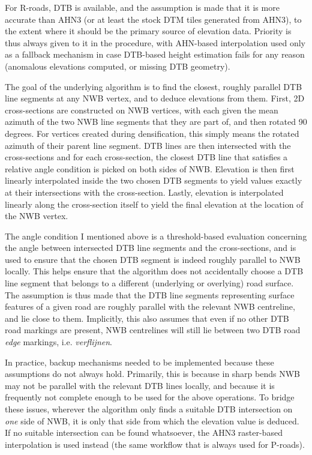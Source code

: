For R-roads, DTB is available, and the assumption is made that it is more accurate than AHN3 (or at least the stock DTM tiles generated from AHN3), to the extent where it should be the primary source of elevation data. Priority is thus always given to it in the procedure, with AHN-based interpolation used only as a fallback mechanism in case DTB-based height estimation fails for any reason (anomalous elevations computed, or missing DTB geometry).

The goal of the underlying algorithm is to find the closest, roughly parallel DTB line segments at any NWB vertex, and to deduce elevations from them. First, 2D cross-sections are constructed on NWB vertices, with each given the mean azimuth of the two NWB line segments that they are part of, and then rotated 90 degrees. For vertices created during densification, this simply means the rotated azimuth of their parent line segment. DTB lines are then intersected with the cross-sections and for each cross-section, the closest DTB line that satisfies a relative angle condition is picked on both sides of NWB. Elevation is then first linearly interpolated inside the two chosen DTB segments to yield values exactly at their intersections with the cross-section. Lastly, elevation is interpolated linearly along the cross-section itself to yield the final elevation at the location of the NWB vertex.

The angle condition I mentioned above is a threshold-based evaluation concerning the angle between intersected DTB line segments and the cross-sections, and is used to ensure that the chosen DTB segment is indeed roughly parallel to NWB locally. This helps ensure that the algorithm does not accidentally choose a DTB line segment that belongs to a different (underlying or overlying) road surface. The assumption is thus made that the DTB line segments representing surface features of a given road are roughly parallel with the relevant NWB centreline, and lie close to them. Implicitly, this also assumes that even if no other DTB road markings are present, NWB centrelines will still lie between two DTB road \textit{edge} markings, i.e. \textit{verflijnen}.

In practice, backup mechanisms needed to be implemented because these assumptions do not always hold. Primarily, this is because in sharp bends NWB may not be parallel with the relevant DTB lines locally, and because it is frequently not complete enough to be used for the above operations. To bridge these issues, wherever the algorithm only finds a suitable DTB intersection on \textit{one} side of NWB, it is only that side from which the elevation value is deduced. If no suitable intersection can be found whatsoever, the AHN3 raster-based interpolation is used instead (the same workflow that is always used for P-roads).

